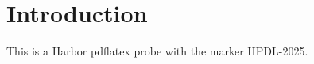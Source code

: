 \documentclass{article}
\begin{document}
\section{Introduction}
This is a Harbor pdflatex probe with the marker HPDL-2025.
\end{document}
